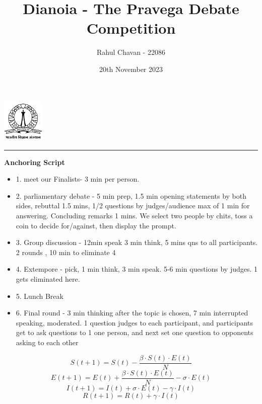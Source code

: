 \documentclass{report}
\title{\textbf{Dianoia - The Pravega Debate Competition}}
\author{Rahul Chavan - 22086}
\date{20th November 2023}
\renewcommand{\maketitle}{
 \begin{center}
    \includegraphics[width=2cm]{IISc_Master_Seal_Black.jpg}
    \vspace{0.5cm}

    \Large
    \textbf{\thetitle}
    
    \vspace{0.5cm}
    
    \Large
    \theauthor
    
    \vspace{0.2cm}
    
    \large
    \thedate

    \vspace{0.5cm}

    \hrule  
    
  \end{center}
}
\begin{document}
\maketitle
\begin{center}
    \Large
    \textbf{Anchoring Script}
\end{center} 

\begin{itemize}
  \item 1. meet our Finalists- 3 min per person.
  \item 2. parliamentary debate - 5 min prep, 1.5 min opening statements by both sides, rebuttal 1.5 mins, 
      1/2 questions by judges/audience max of 1 min for answering. Concluding remarks 1 mins. We select two people by chits, toss a coin 
      to decide for/against, then display the prompt.
  \item 3. Group discussion - 12min speak 3 min think, 5 mins qns to all participants. 2 rounds , 10 min to eliminate 4
  \item 4. Extempore - pick, 1 min think, 3 min speak. 5-6 min questions by judges. 1 gets eliminated here.
  \item 5. Lunch Break
  \item 6. Final round - 3 min thinking after the topic is chosen, 7 min interrupted speaking, moderated. 1 
         question judges to each participant, and participants get to ask questions to 1 one person, and next set one question to opponents asking to each other
         
\end{itemize}

\[S(t+1)=S(t)-\frac{\beta\cdot S(t) \cdot E(t)}{N}\]
\[E(t+1)=E(t)+\frac{\beta\cdot S(t) \cdot E(t)}{N}-\sigma\cdot E(t)\]
\[ I(t+1)=I(t)+\sigma \cdot E(t)-\gamma \cdot I(t)\]
\[R(t+1)=R(t)+\gamma \cdot I(t)\]
\end{document}
